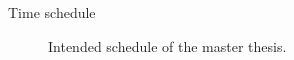 \begin{frame}{Time schedule}%
    \begin{figure}[htb]%
        \centering%
        \caption{Intended schedule of the master thesis.}%
        \label{fig:schedule}%
    \end{figure}%
\end{frame}%
%